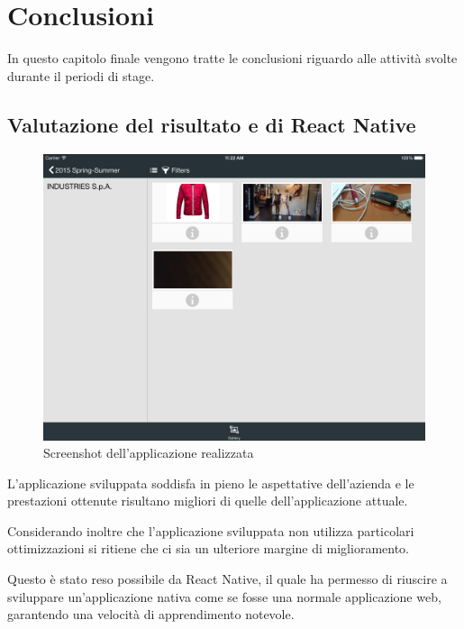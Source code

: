 
\chapter{Conclusioni}
\label{cap:conclusioni}

In questo capitolo finale vengono tratte le conclusioni riguardo alle attività svolte durante il periodi di stage.

\section{Valutazione del risultato e di React Native}

\begin{figure}[htp]
\centering
\includegraphics[width=\textwidth]{../immagini/wg-gallery}
\caption{Screenshot dell'applicazione realizzata}  
\end{figure}

L'applicazione sviluppata soddisfa in pieno le aspettative dell'azienda e le prestazioni ottenute risultano migliori di quelle dell'applicazione attuale.

Considerando inoltre che l'applicazione sviluppata non utilizza particolari ottimizzazioni si ritiene che ci sia un ulteriore margine di miglioramento.

Questo è stato reso possibile da React Native, il quale ha permesso di riuscire a sviluppare un'applicazione nativa come se fosse una normale applicazione web, garantendo una velocità di apprendimento notevole.

